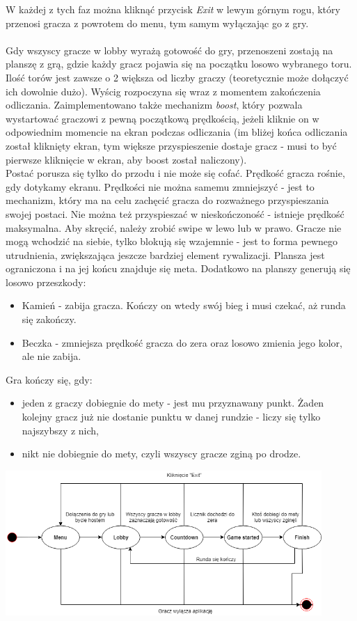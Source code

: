 \documentclass[]{report}
\begin{document}
W każdej z tych faz można kliknąć przycisk \textit{Exit} w lewym górnym rogu, który przenosi gracza z powrotem do menu, tym samym wyłączając go z gry. \\\\
Gdy wszyscy gracze w lobby wyrażą gotowość do gry, przenoszeni zostają na planszę z grą, gdzie każdy gracz pojawia się na początku losowo wybranego toru. Ilość torów jest zawsze o 2 większa od liczby graczy (teoretycznie może dołączyć ich dowolnie dużo).
Wyścig rozpoczyna się wraz z momentem zakończenia odliczania. Zaimplementowano także mechanizm \textit{boost}, który pozwala wystartować graczowi z pewną początkową prędkością, jeżeli kliknie on w odpowiednim momencie na ekran podczas odliczania (im bliżej końca odliczania został kliknięty ekran, tym większe przyspieszenie dostaje gracz - musi to być pierwsze kliknięcie w ekran, aby boost został naliczony).\\
Postać porusza się tylko do przodu i nie może się cofać. Prędkość gracza rośnie, gdy dotykamy ekranu. Prędkości nie można samemu zmniejszyć - jest to mechanizm, który ma na celu zachęcić gracza do rozważnego przyspieszania swojej postaci. Nie można też przyspieszać w nieskończoność - istnieje prędkość maksymalna. Aby skręcić, należy zrobić swipe w lewo lub w prawo. Gracze nie mogą wchodzić na siebie, tylko blokują się wzajemnie - jest to forma pewnego utrudnienia, zwiększająca jeszcze bardziej element rywalizacji. Plansza jest ograniczona i na jej końcu znajduje się meta. Dodatkowo na planszy generują się losowo przeszkody:
\begin{itemize}
	\item Kamień - zabija gracza. Kończy on wtedy swój bieg i musi czekać, aż runda się zakończy.
	\item Beczka - zmniejsza prędkość gracza do zera oraz losowo zmienia jego kolor, ale nie zabija.
\end{itemize}
Gra kończy się, gdy:
\begin{itemize}
	\item jeden z graczy dobiegnie do mety - jest mu przyznawany punkt. Żaden kolejny gracz już nie dostanie punktu w danej rundzie - liczy się tylko najszybszy z nich,
	\item nikt nie dobiegnie do mety, czyli wszyscy gracze zginą po drodze.
\end{itemize}
\begin{center}
	\includegraphics[width=0.9\textwidth]{game_cycle.png}
\end{center}
\end{document}
